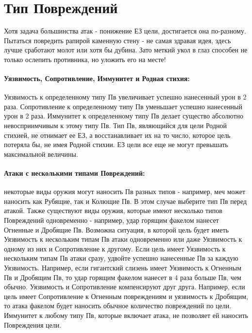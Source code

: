 \section{Тип Повреждений}

\newline
Хотя задача большинства атак - понижение ЕЗ цели, достигается она по-разному. Пытаться повредить рапирой каменную стену - не самая здравая идея, здесь лучше сработают молот или хотя бы дубина. Зато меткий укол в глаз способен не только ослепить противника, но уложить его на месте!
\paragraph{Уязвимость, Сопротивление, Иммунитет и Родная стихия:} Уязвимость к определенному типу Пв увеличивает успешно нанесенный урон в 2 раза. Сопротивление к определенному типу Пв уменьшает успешно нанесенный урон в 2 раза. Иммунитет к определенному типу Пв делает существо абсолютно невосприимчивым к этому типу Пв. Тип Пв, являющийся для цели Родной стихией, не отнимает ее ЕЗ, а восстанавливает их на то число, которое цель потеряла бы, не имея Родной стихии. ЕЗ цели все еще не могут превышать максимальной величины.
\paragraph{Атаки с несколькими типами Повреждений:} некоторые виды оружия могут наносить Пв разных типов - например, меч может наносить как Рубящие, так и Колющие Пв. В этом случае выберите тип Пв перед атакой.
\newline
Также существуют виды оружия, которые имеют несколько типов Повреждений одновременно - например, удар горящим факелом нанесет Огненные и Дробящие Пв. Возможна ситуация, в которой цель будет иметь Уязвимость к нескольким типам Пв атаки одновременно или даже Уязвимость к одному из них и Сопротивление к другому.
\newline
Если цель имеет Уязвимость к нескольким типам Пв атаки сразу, удвойте успешно нанесенные Пв за каждую Уязвимость. Например, если гигантский слизень имеет Уязвимость к Огненным Пв и Дробящим Пв, то удар горящим факелом нанесет в 4 раза больше Пв, чем обычно.
\newline
Уязвимость и Сопротивление компенсируют друг друга. Например, если цель имеет Сопротивление к Огненным повреждениям и уязвимость к Дробящим, то атака факелом будет наносить обычное количество повреждений по цели.
\newline
Иммунитет к любому типу Пв, которые включает атака, не позволяет ей наносить Повреждения цели.
